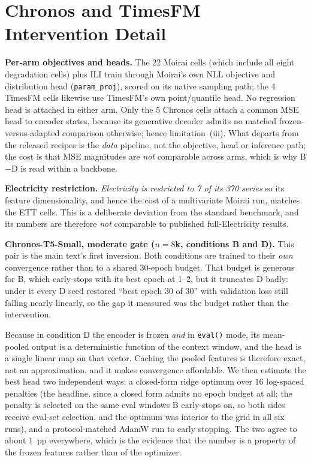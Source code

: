 \documentclass{article}
\begin{document}
\section{Chronos and TimesFM Intervention Detail}
\label{app:crossbackbone}

\textbf{Per-arm objectives and heads.} The 22 Moirai cells (which include all eight degradation
cells) plus ILI train through Moirai's own NLL objective and distribution head
(\texttt{param\_proj}), scored on its native sampling path; the 4 TimesFM cells likewise use
TimesFM's own point/quantile head. No regression head is attached in either arm. Only the 5 Chronos
cells attach a common MSE head to encoder states, because its generative decoder admits no matched
frozen-versus-adapted comparison otherwise; hence limitation~(iii). What departs from the released
recipes is the \emph{data} pipeline, not the objective, head or inference path; the cost is that MSE
magnitudes are \emph{not} comparable across arms, which is why B$-$D is read within a backbone.

\textbf{Electricity restriction.} \emph{Electricity is restricted to 7 of its 370 series} so its
feature dimensionality, and hence the cost of a multivariate Moirai run, matches the ETT cells.
This is a deliberate deviation from the standard benchmark, and its numbers are therefore \emph{not}
comparable to published full-Electricity results.

\textbf{Chronos-T5-Small, moderate gate ($n{=}8$k, conditions B and D).} This pair is the main
text's first inversion. Both conditions are trained to their \emph{own} convergence rather than to a shared $30$-epoch
budget. That budget is generous for B, which early-stops with its best epoch at 1--2, but it
truncates D badly: under it every D seed restored ``best epoch $30$ of $30$'' with validation loss
still falling nearly linearly, so the gap it measured was the budget rather than the intervention.

Because in condition D the encoder is frozen \emph{and} in \texttt{eval()} mode, its mean-pooled
output is a deterministic function of the context window, and the head is a single linear map on
that vector. Caching the pooled features is therefore exact, not an approximation, and it makes
convergence affordable. We then estimate the best head two independent ways: a closed-form ridge
optimum over $16$ log-spaced penalties (the headline, since a closed form admits no epoch budget
at all; the penalty is selected on the same eval windows B early-stops on, so both sides receive
eval-set selection, and the optimum was interior to the grid in all six runs), and a
protocol-matched AdamW run to early stopping. The two agree to about $1$~pp everywhere, which is
the evidence that the number is a property of the frozen features rather than of the optimizer.
\end{document}
